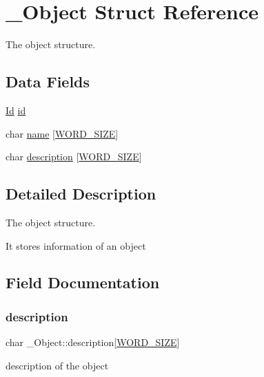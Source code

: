 \hypertarget{struct__Object}{}\section{\+\_\+\+Object Struct Reference}
\label{struct__Object}


The object structure.  


\subsection*{Data Fields}
\begin{DoxyCompactItemize}
\item 
\hyperlink{types_8h_a845e604fb28f7e3d97549da3448149d3}{Id} \hyperlink{struct__Object_a3cff7a0e8dc4e9d23895ed9af1b7653a}{id}
\item 
char \hyperlink{struct__Object_a3dab853826b88558a2c07dec50b96d57}{name} \mbox{[}\hyperlink{types_8h_a92ed8507d1cd2331ad09275c5c4c1c89}{W\+O\+R\+D\+\_\+\+S\+I\+ZE}\mbox{]}
\item 
char \hyperlink{struct__Object_a556e2e37c1461bcaae6492d2101f407d}{description} \mbox{[}\hyperlink{types_8h_a92ed8507d1cd2331ad09275c5c4c1c89}{W\+O\+R\+D\+\_\+\+S\+I\+ZE}\mbox{]}
\end{DoxyCompactItemize}


\subsection{Detailed Description}
The object structure. 

It stores information of an object 

\subsection{Field Documentation}
\mbox{\label{struct__Object_a556e2e37c1461bcaae6492d2101f407d}} 
\subsubsection{\texorpdfstring{description}{description}}
{\footnotesize\ttfamily char \+\_\+\+Object\+::description\mbox{[}\hyperlink{types_8h_a92ed8507d1cd2331ad09275c5c4c1c89}{W\+O\+R\+D\+\_\+\+S\+I\+ZE}\mbox{]}}

description of the object \mbox{\label{struct__Object_a3cff7a0e8dc4e9d23895ed9af1b7653a}} 
